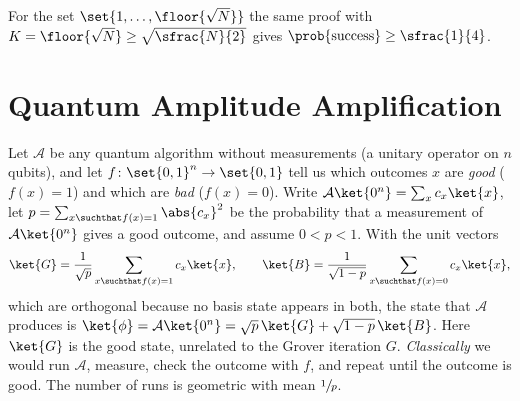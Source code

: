 For the set $\set{1, \dots, \floor{\sqrt{N}}}$ the same proof with
$K = \floor{\sqrt{N}} \geq \sqrt{\sfrac{N}{2}}$ gives $\prob{\text{success}} \geq \sfrac{1}{4}$.

\section{Quantum Amplitude Amplification}\label{sec:ampamp-1008}

Let $\mathcal{A}$ be any quantum algorithm without measurements (a unitary operator on $n$
qubits), and let $f \colon \set{0,1}^n \to \set{0,1}$ tell us which outcomes $x$ are \emph{good}
($f(x) = 1$) and which are \emph{bad} ($f(x) = 0$). Write
$\mathcal{A}\ket{0^n} = \sum_x c_x \ket{x}$, let
$p = \sum_{x \suchthat f(x) = 1} \abs{c_x}^2$ be the probability that a measurement of
$\mathcal{A}\ket{0^n}$ gives a good outcome, and assume $0 < p < 1$. With the unit vectors
\[\ket{G} = \frac{1}{\sqrt{p}} \sum_{x \suchthat f(x) = 1} c_x \ket{x},
    \qquad
    \ket{B} = \frac{1}{\sqrt{1-p}} \sum_{x \suchthat f(x) = 0} c_x \ket{x},\]
which are orthogonal because no basis state appears in both, the state that $\mathcal{A}$ produces is
$\ket{\phi} = \mathcal{A}\ket{0^n} = \sqrt{p}\, \ket{G} + \sqrt{1-p}\, \ket{B}$. Here $\ket{G}$ is
the good state, unrelated to the Grover iteration $G$.
\emph{Classically} we would run $\mathcal{A}$, measure, check the outcome with $f$, and repeat until
the outcome is good. The number of runs is geometric with mean $\sfrac{1}{p}$.

